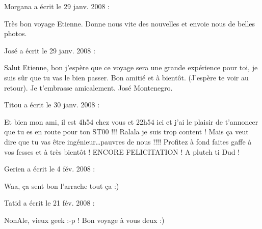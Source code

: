\medskip
Morgana a écrit le 29 janv. 2008 :
\begin{displayquote}
Très bon voyage Etienne. Donne nous vite des nouvelles et envoie nous de belles photos.
\end{displayquote}

\medskip
José a écrit le 29 janv. 2008 :
\begin{displayquote}
Salut Etienne, bon j'espère que ce voyage sera une grande expérience pour toi, je suis sûr que tu vas le bien passer.
 Bon amitié et à bientôt. (J'espère te voir au retour).
 Je t'embrasse amicalement. José Montenegro.
\end{displayquote}

\medskip
Titou a écrit le 30 janv. 2008 :
\begin{displayquote}
Et bien mon ami, il est 4h54 chez vous et 22h54 ici et j'ai le plaisir de t'annoncer que tu es en route pour ton ST00 !!! Ralala je suis trop content ! Mais ça veut dire que tu vas être ingénieur\dots pauvres de nous !!!! Profitez à fond faites gaffe à vos fesses et à très bientôt ! ENCORE FELICITATION ! A plutch ti Dud !
\end{displayquote}

\medskip
Gerien a écrit le 4 fév. 2008 :
\begin{displayquote}
Waa, ça sent bon l'arrache tout ça :)
\end{displayquote}

\medskip
Tatid a écrit le 21 fév. 2008 :
\begin{displayquote}
NonAle, vieux geek :-p !
Bon voyage à vous deux :)
\end{displayquote}

\vfill
